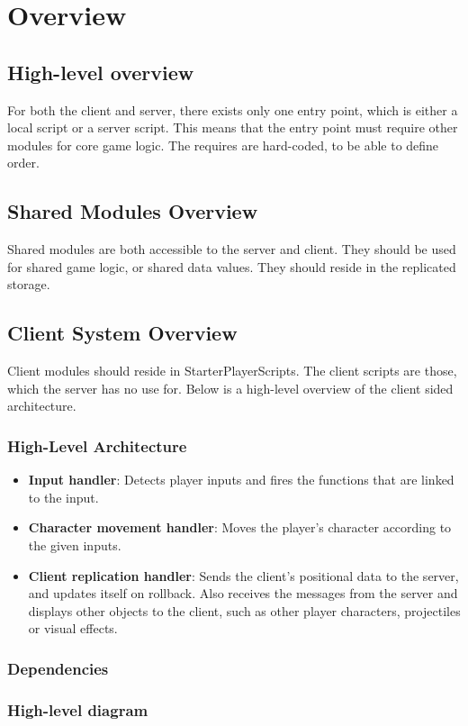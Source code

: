 \chapter{Overview}

\section{High-level overview}
For both the client and server, there exists only one entry point, which is either a local script or a server script. This means that the entry point must require other modules for core game logic. The requires are hard-coded, to be able to define order.
\section{Shared Modules Overview}
Shared modules are both accessible to the server and client. They should be used for shared game logic, or shared data values. They should reside in the replicated storage.
\section{Client System Overview}
Client modules should reside in StarterPlayerScripts. The client scripts are those, which the server has no use for.
Below is a high-level overview of the client sided architecture.
\subsection{High-Level Architecture}
\begin{itemize}
    \item \textbf{Input handler}: Detects player inputs and fires the functions that are linked to the input.
    \item \textbf{Character movement handler}: Moves the player's character according to the given inputs.
    \item \textbf{Client replication handler}: Sends the client's positional data to the server, and updates itself on rollback. Also receives the messages from the server and displays other objects to the client, such as other player characters, projectiles or visual effects.
\end{itemize}
\subsection{Dependencies}
\subsection{High-level diagram}

